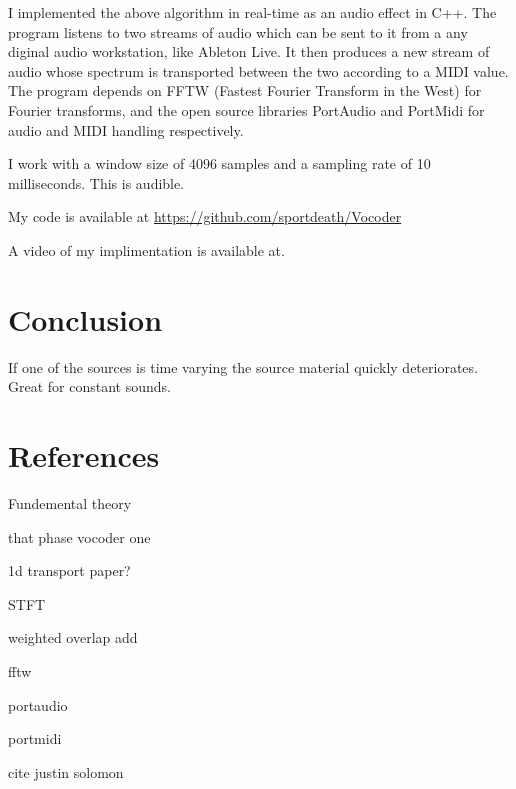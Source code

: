 \documentclass[12pt]{article}
\begin{document}
I implemented the above algorithm in real-time as an audio effect in C++.
The program listens to two streams of audio
which can be sent to it from a any diginal audio workstation, like Ableton Live.
It then produces a new stream of audio 
whose spectrum is transported between the two
according to a MIDI value.
The program depends on FFTW (Fastest Fourier Transform in the West) for Fourier transforms, and the open source libraries PortAudio and PortMidi for audio and MIDI handling respectively.

I work with a window size of 4096 samples and a sampling rate of 10 milliseconds. This is audible. 

My code is available at
\url{https://github.com/sportdeath/Vocoder}

A video of my implimentation is available at.

\section{Conclusion}

If one of the sources is time varying the source material quickly deteriorates.
Great for constant sounds.

\section{References}

Fundemental theory

that phase vocoder one

1d transport paper?

STFT

weighted overlap add

fftw

portaudio

portmidi

cite justin solomon
\end{document}
